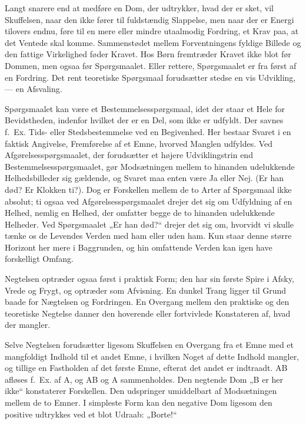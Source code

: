 \documentclass[12pt,a4paper]{book}
\newcommand{\apage}[1]{\marginnote{\footnotesize\textit{[#1]}}}
\begin{document}
Langt snarere end at medføre en Dom, der udtrykker, hvad der er sket, vil
Skuffelsen, naar den ikke fører til fuldstændig Slappelse, men naar der
er Energi tilovers endnu, føre til en mere eller mindre utaalmodig
Fordring, et Krav paa, at det Ventede skal komme. Sammenstødet mellem
Forventningens fyldige Billede og den fattige Virkelighed føder Kravet.
Hos Børn fremtræder Kravet ikke blot før Dommen, men ogsaa før
Spørgsmaalet. Eller rettere, Spørgsmaalet er fra først af en Fordring.
Det rent teoretiske Spørgsmaal forudsætter stedse en vis Udvikling, ---
en Afsvaling.

Spørgsmaalet kan være et Bestemmelsesspørgsmaal, idet der staar et Hele
for Bevidstheden, indenfor hvilket der er en Del, som ikke er udfyldt.
Der savnes f.\ Ex. Tids- eller Stedsbestemmelse ved en Begivenhed. Her
bestaar Svaret i en faktisk Angivelse, Fremførelse af et Emne, hvorved
Manglen udfyldes. Ved Afgørelsesspørgsmaalet, der forudsætter et højere
Udviklingstrin end Bestemmelsesspørgsmaalet, gør Modsætningen mellem to
hinanden udelukkende Helhedsbilleder sig gældende, og Svaret maa enten
være Ja eller Nej. (Er han død? Er Klokken ti?). Dog er Forskellen
mellem de to Arter af Spørgsmaal ikke absolut; ti ogsaa ved
Afgørelsesspørgsmaalet drejer det sig om Udfyldning af en Helhed, nemlig
en Helhed, der omfatter begge de to hinanden udelukkende Helheder. Ved
Spørgsmaalet „Er han \apage{76} død?“ drejer det sig om, hvorvidt vi skulle tænke
os de Levendes Verden med ham eller uden ham. Kun staar denne større
Horizont her mere i Baggrunden, og hin omfattende Verden kan igen have
forskelligt Omfang.

Negtelsen optræder ogsaa først i praktisk Form; den har sin første Spire
i Afsky, Vrede og Frygt, og optræder som Afvisning. En dunkel Trang
ligger til Grund baade for Nægtelsen og Fordringen. En Overgang mellem
den praktiske og den teoretiske Negtelse danner den hoverende eller
fortvivlede Konstateren af, hvad der mangler.

Selve Negtelsen forudsætter ligesom Skuffelsen en Overgang fra et Emne
med et mangfoldigt Indhold til et andet Emne, i hvilken Noget af dette
Indhold mangler, og tillige en Fastholden af det første Emne, efterat
det andet er indtraadt. AB afløses f.\ Ex. af A, og AB og A
sammenholdes. Den negtende Dom „B er her ikke“ konstaterer Forskellen.
Den udspringer umiddelbart af Modsætningen mellem de to Emner. I
simpleste Form kan den negative Dom ligesom den positive udtrykkes ved
et blot Udraab: „Borte!“
\end{document}
